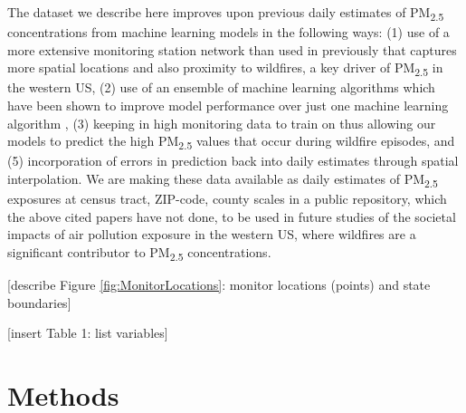 \documentclass[english]{article}
\begin{document}
The dataset we describe here improves upon previous daily estimates of PM\textsubscript{2.5} concentrations from machine learning models in the following ways: (1) use of a more extensive monitoring station network than used in previously that captures more spatial locations and also proximity to wildfires, a key driver of PM\textsubscript{2.5} in the western US, (2) use of an ensemble of machine learning algorithms which have been shown to improve model performance over just one machine learning algorithm \cite{di_ensemble-based_2019},
(3) keeping in high monitoring data to train on thus allowing our models to predict the high PM\textsubscript{2.5} values that occur during wildfire episodes, and (5) incorporation of errors in prediction back into daily estimates through spatial interpolation. We are making these data available as daily estimates of PM\textsubscript{2.5} exposures at census tract, ZIP-code, county scales in a public repository, which the above cited papers have not done, to be used in future studies of the societal impacts of air pollution exposure in the western US, where wildfires are a significant contributor to PM\textsubscript{2.5} concentrations.

[describe Figure \ref{fig:MonitorLocations}:  monitor locations (points) and state boundaries] %

[insert Table 1: list variables]

\section*{Methods}

\end{document}
